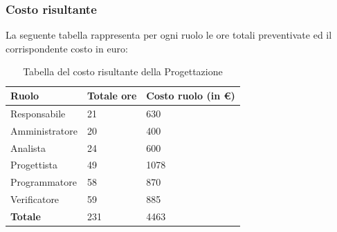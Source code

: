 
\clearpage
\subsubsection{Costo risultante}
La seguente tabella rappresenta per ogni ruolo le ore totali preventivate ed il corrispondente costo in euro:
{
\renewcommand{\arraystretch}{2}
\begin{longtable}{ C{3cm} C{2cm} C{4cm}}
\caption{Tabella del costo risultante della Progettazione}\\
\rowcolor{\primaryColor}

\textcolor{\secondaryColor}{\textbf{Ruolo}} & 
\textcolor{\secondaryColor}{\textbf{Totale ore}} & 
\textcolor{\secondaryColor}{\textbf{Costo ruolo (in \euro{})}}\\	
\endhead
        
Responsabile    &  21 &  630 \\
Amministratore  &  20 &  400 \\
Analista        &  24 &  600 \\
Progettista     &  49 &  1078 \\
Programmatore   &  58 &  870 \\
Verificatore    &  59 &  885 \\
\textbf{Totale} &  231 & 4463 \\	
        	
\end{longtable}
}

